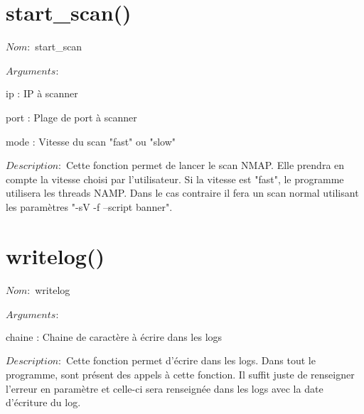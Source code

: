 \documentclass[12pt]{report}
\begin{document}
		\section{start\_scan()}
			{\setlength{\parindent}{0cm}
			$Nom :$ start\_scan\\\\
			}
			$Arguments :$
			\begin{description}
				\item ip : IP à scanner
				\item port : Plage de port à scanner
				\item mode : Vitesse du scan "fast" ou "slow"\\
			\end{description}
			$Description : $ Cette fonction permet de lancer le scan NMAP. Elle prendra en compte la vitesse choisi par l'utilisateur. Si la vitesse est "fast", le programme utilisera les threads NAMP. Dans le cas contraire il fera un scan normal utilisant les paramètres "-sV -f --script banner".
		\section{writelog()}
			{\setlength{\parindent}{0cm}
			$Nom :$ writelog\\\\
			}
			$Arguments :$
			\begin{description}
				\item chaine : Chaine de caractère à écrire dans les logs\\
			\end{description}
			$Description : $ Cette fonction permet d'écrire dans les logs. Dans tout le programme, sont présent des appels à cette fonction. Il suffit juste de renseigner l'erreur en paramètre et celle-ci sera renseignée dans les logs avec la date d'écriture du log.
\end{document}

